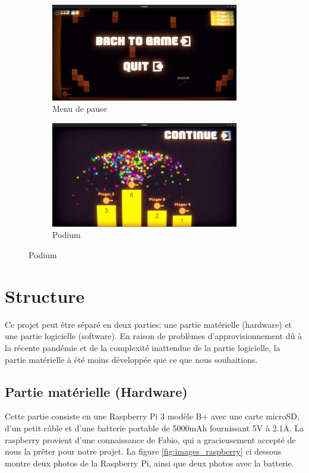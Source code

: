 \documentclass[a4paper]{article}
\begin{document}
\begin{figure}[h]
    \begin{subfigure}{0.5\textwidth}
        \includegraphics[width=0.9\textwidth]{images/game/pause_menu.png}
        \caption{Menu de pause}
        \label{fig:pause_menu}
    \end{subfigure}
        \begin{subfigure}{0.5\textwidth}
        \includegraphics[width=0.9\textwidth]{images/game/podium.png}
        \caption{Podium}
        \label{fig:podium}
    \end{subfigure}
\end{figure}

\section{Structure}
Ce projet peut être séparé en deux parties: une partie matérielle (hardware) et une partie logicielle (software). En raison de problèmes d’approvisionnement dû à la récente pandémie et de la complexité inattendue de la partie logicielle, la partie matérielle à été moins développée que ce que nous souhaitions.

\subsection{Partie matérielle (Hardware)}
Cette partie consiste en une Raspberry Pi 3 modèle B+ avec une carte microSD, d’un petit câble et d’une batterie portable de 5000mAh fournissant 5V à 2.1A. La raspberry provient d’une connaissance de Fabio, qui a gracieusement accepté de nous la prêter pour notre projet.
La figure \ref{fig:images_raspberry} ci dessous montre deux photos de la Raspberry Pi, ainsi que deux photos avec la batterie.
\end{document}
